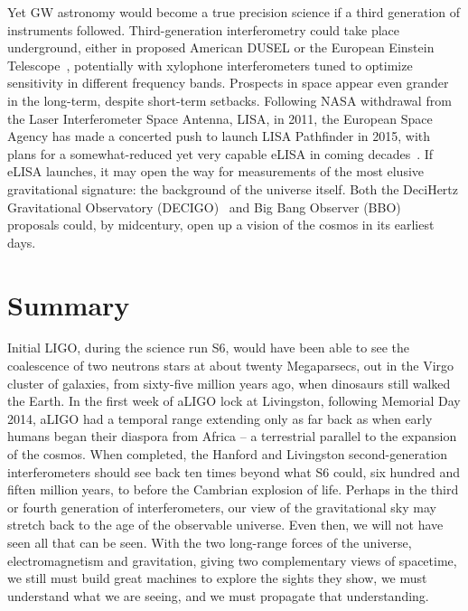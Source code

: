 Yet GW astronomy would become a true precision science if a third generation of instruments followed.
Third-generation interferometry could take place underground, either in proposed American DUSEL or the European Einstein Telescope~\cite{Punturo2010}, potentially with xylophone interferometers tuned to optimize sensitivity in different frequency bands.
Prospects in space appear even grander in the long-term, despite short-term setbacks. 
Following NASA withdrawal from the Laser Interferometer Space Antenna, LISA, in 2011, the European Space Agency has made a concerted push to launch LISA Pathfinder in 2015, with plans for a somewhat-reduced yet very capable eLISA in coming decades~\cite{Vitale2014}.
If eLISA launches, it may open the way for measurements of the most elusive gravitational signature: the background of the universe itself.
Both the DeciHertz Gravitational Observatory (DECIGO)~\cite{Ando2010} and Big Bang Observer (BBO)~\cite{Harry2006} proposals could, by midcentury, open up a vision of the cosmos in its earliest days.

    \section{Summary}
    \label{intro_summary}
 

Initial LIGO, during the science run S6, would have been able to see the coalescence of two neutrons stars at about twenty Megaparsecs, out in the Virgo cluster of galaxies, from sixty-five million years ago, when dinosaurs still walked the Earth. 
In the first week of aLIGO lock at Livingston, following Memorial Day 2014, aLIGO had a temporal range extending only as far back as when early humans began their diaspora from Africa -- a terrestrial parallel to the expansion of the cosmos.
When completed, the Hanford and Livingston second-generation interferometers should see back ten times beyond what S6 could, six hundred and fiften million years, to before the Cambrian explosion of life.
Perhaps in the third or fourth generation of interferometers, our view of the gravitational sky may stretch back to the age of the observable universe.
Even then, we will not have seen all that can be seen.
With the two long-range forces of the universe, electromagnetism and gravitation, giving two complementary views of spacetime, we still must build great machines to explore the sights they show, we must understand what we are seeing, and we must propagate that understanding. 


